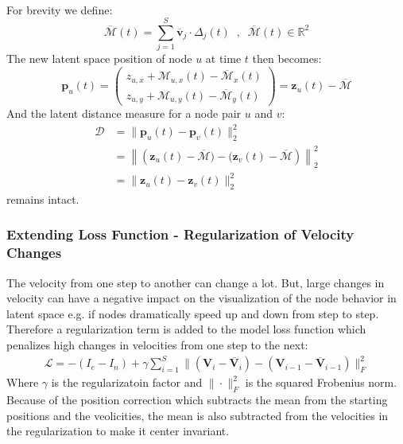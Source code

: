 \\
For brevity we define:
\begin{equation}
    \overline{\mathcal{M}}(t) = \sum_{j=1}^S \overline{\textbf{v}}_j \cdot \Delta_{j}(t) \;\;,\;\; \overline{\mathcal{M}}(t) \in \mathbb{R}^{2}
\end{equation}
The new latent space position of node $u$ at time $t$ then becomes:
\begin{equation}
    \textbf{p}_u(t) = 
     \begin{pmatrix}
        z_{u,x} + \mathcal{M}_{u,x}(t) - \overline{\mathcal{M}}_{x}(t) \\
        z_{u,y}+ \mathcal{M}_{u,y}(t) - \overline{\mathcal{M}}_{y}(t)
    \end{pmatrix} =
    \textbf{z}_u(t) - \overline{\mathcal{M}}
\end{equation}
And the latent distance measure for a node pair $u$ and $v$:
\begin{align}
     \mathcal{D} &= \rVert \textbf{p}_u(t) - \textbf{p}_v(t) \rVert_2^2 \\
     &= \left\rVert \left(\textbf{z}_u(t)-\overline{\mathcal{M}}) - (\textbf{z}_v(t)-\overline{\mathcal{M}}\right) \right\rVert_2^2 \\
     &= \rVert \textbf{z}_u(t) - \textbf{z}_v(t) \rVert_2^2 
\end{align}
remains intact.

\subsubsection{Extending Loss Function - Regularization of Velocity Changes}
\label{sec:Method:ProposedModel:Regularization}
The velocity from one step to another can change a lot. But, large changes in velocity can have a negative impact on the visualization of the node behavior in latent space e.g. if nodes dramatically speed up and down from step to step.
Therefore a regularization term is added to the model loss function which penalizes high changes in velocities from one step to the next:
\begin{align}
    \mathcal{L} = - (I_e - I_n) + \gamma \sum_{i=1}^{S} \rVert (\textbf{V}_i - \overline{\textbf{V}}_i) - (\textbf{V}_{i-1} - \overline{\textbf{V}}_{i-1}) \rVert_{F}^{2}
    \label{eq:Method:ProposedModel:vec_regularization}
\end{align}
Where $\gamma$ is the regularizatoin factor and $\rVert \cdot \rVert_F^2$ is the squared Frobenius norm. Because of the position correction which subtracts the mean from the starting positions and the veolicities, the mean is also subtracted from the velocities in the regularization to make it center invariant.